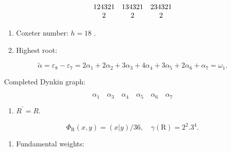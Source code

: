 \[
\begin{array}{c c c} 1 2 4 3 2 1 & 1 3 4 3 2 1 & 2 3 4 3 2 1 \\ 2 & 2 & 2 \end{array}
\]

\begin{enumerate}
\def\labelenumi{(\Roman{enumi})}
\setcounter{enumi}{2}
\item
  Coxeter number: \(h = 18\) .
\item
  Highest root:
\end{enumerate}

\[
\tilde {\alpha} = \varepsilon_ {8} - \varepsilon_ {7} = 2 \alpha_ {1} + 2 \alpha_ {2} + 3 \alpha_ {3} + 4 \alpha_ {4} + 3 \alpha_ {5} + 2 \alpha_ {6} + \alpha_ {7} = \omega_ {1}.
\]

Completed Dynkin graph:

\[
\alpha_ {1} \quad \alpha_ {3} \quad \alpha_ {4} \quad \alpha_ {5} \quad \alpha_ {6} \quad \alpha_ {7}
\]

\begin{enumerate}
\def\labelenumi{(\Alph{enumi})}
\setcounter{enumi}{21}
\tightlist
\item
  \(R^{\prime} = R.\)
\end{enumerate}

\[
  \Phi_ {\mathrm{R}} (x, y) = (x | y) / 36, \quad \gamma (\mathrm{R}) = 2 ^ {2}. 3 ^ {4}.
\]

\begin{enumerate}
\def\labelenumi{(\Roman{enumi})}
\setcounter{enumi}{5}
\tightlist
\item
  Fundamental weights:
\end{enumerate}


